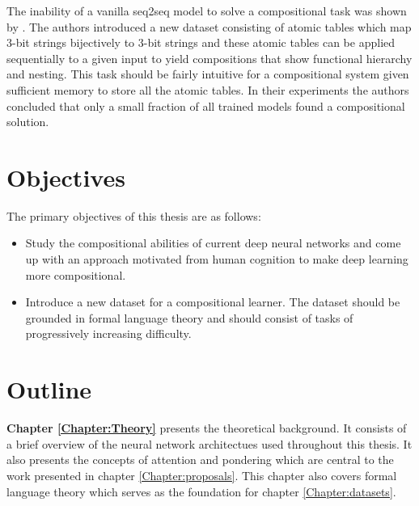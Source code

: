 The inability of a vanilla seq2seq model to solve a compositional task was shown by \cite{Liska2018}. The authors introduced a new dataset consisting of atomic tables which map 3-bit strings bijectively to 3-bit strings and these atomic tables can be applied sequentially to a given input to yield compositions that show functional hierarchy and nesting. This task should be fairly intuitive for a compositional system given sufficient memory to store all the atomic tables. In their experiments the authors concluded that only a small fraction of all trained models found a compositional solution.


		
\section{Objectives}
	The primary objectives of this thesis are as follows:
	\begin{itemize}
		\item Study the compositional abilities of current deep neural networks and come up with an approach motivated from human cognition to make deep learning more compositional.
		\item Introduce a new dataset for a compositional learner. The dataset should be grounded in formal language theory and should consist of tasks of progressively increasing difficulty.
	\end{itemize}

	
\section{Outline}
	\textbf{Chapter \ref{Chapter:Theory}} presents the theoretical background. It consists of a brief overview of the neural network architectues used throughout this thesis. It also presents the concepts of attention and pondering which are central to the work presented in chapter \ref{Chapter:proposals}. This chapter also covers formal language theory which serves as the foundation for chapter \ref{Chapter:datasets}.
	
